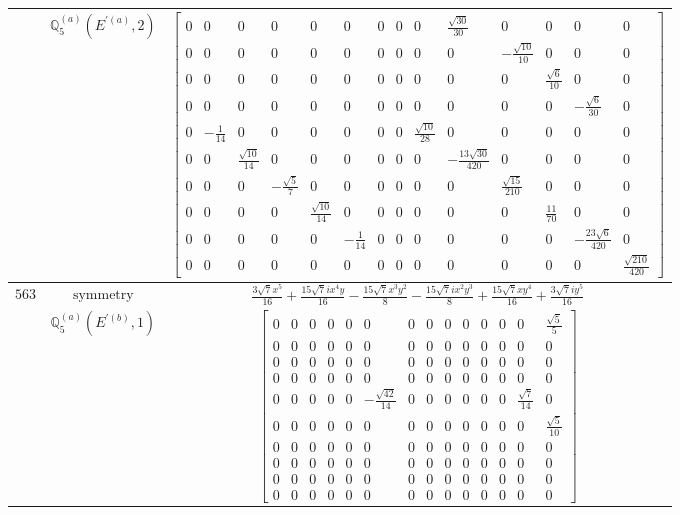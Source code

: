 \documentclass[fleqn,8pt,landscape]{jsarticle}
\begin{document}
\begin{longtable}{ccc}
$  $ & $ \mathbb{Q}_{5}^{(a)}(E^{\prime(a)},2) $ & $ \begin{bmatrix} 0 & 0 & 0 & 0 & 0 & 0 & 0 & 0 & 0 & \frac{\sqrt{30}}{30} & 0 & 0 & 0 & 0 \\ 0 & 0 & 0 & 0 & 0 & 0 & 0 & 0 & 0 & 0 & - \frac{\sqrt{10}}{10} & 0 & 0 & 0 \\ 0 & 0 & 0 & 0 & 0 & 0 & 0 & 0 & 0 & 0 & 0 & \frac{\sqrt{6}}{10} & 0 & 0 \\ 0 & 0 & 0 & 0 & 0 & 0 & 0 & 0 & 0 & 0 & 0 & 0 & - \frac{\sqrt{6}}{30} & 0 \\ 0 & - \frac{1}{14} & 0 & 0 & 0 & 0 & 0 & 0 & \frac{\sqrt{10}}{28} & 0 & 0 & 0 & 0 & 0 \\ 0 & 0 & \frac{\sqrt{10}}{14} & 0 & 0 & 0 & 0 & 0 & 0 & - \frac{13 \sqrt{30}}{420} & 0 & 0 & 0 & 0 \\ 0 & 0 & 0 & - \frac{\sqrt{5}}{7} & 0 & 0 & 0 & 0 & 0 & 0 & \frac{\sqrt{15}}{210} & 0 & 0 & 0 \\ 0 & 0 & 0 & 0 & \frac{\sqrt{10}}{14} & 0 & 0 & 0 & 0 & 0 & 0 & \frac{11}{70} & 0 & 0 \\ 0 & 0 & 0 & 0 & 0 & - \frac{1}{14} & 0 & 0 & 0 & 0 & 0 & 0 & - \frac{23 \sqrt{6}}{420} & 0 \\ 0 & 0 & 0 & 0 & 0 & 0 & 0 & 0 & 0 & 0 & 0 & 0 & 0 & \frac{\sqrt{210}}{420} \end{bmatrix} $ \\ \hline
$ 563 $ & $ \text{symmetry} $ & $ \frac{3 \sqrt{7} x^{5}}{16} + \frac{15 \sqrt{7} i x^{4} y}{16} - \frac{15 \sqrt{7} x^{3} y^{2}}{8} - \frac{15 \sqrt{7} i x^{2} y^{3}}{8} + \frac{15 \sqrt{7} x y^{4}}{16} + \frac{3 \sqrt{7} i y^{5}}{16} $ \\
$  $ & $ \mathbb{Q}_{5}^{(a)}(E^{\prime(b)},1) $ & $ \begin{bmatrix} 0 & 0 & 0 & 0 & 0 & 0 & 0 & 0 & 0 & 0 & 0 & 0 & 0 & \frac{\sqrt{5}}{5} \\ 0 & 0 & 0 & 0 & 0 & 0 & 0 & 0 & 0 & 0 & 0 & 0 & 0 & 0 \\ 0 & 0 & 0 & 0 & 0 & 0 & 0 & 0 & 0 & 0 & 0 & 0 & 0 & 0 \\ 0 & 0 & 0 & 0 & 0 & 0 & 0 & 0 & 0 & 0 & 0 & 0 & 0 & 0 \\ 0 & 0 & 0 & 0 & 0 & - \frac{\sqrt{42}}{14} & 0 & 0 & 0 & 0 & 0 & 0 & \frac{\sqrt{7}}{14} & 0 \\ 0 & 0 & 0 & 0 & 0 & 0 & 0 & 0 & 0 & 0 & 0 & 0 & 0 & \frac{\sqrt{5}}{10} \\ 0 & 0 & 0 & 0 & 0 & 0 & 0 & 0 & 0 & 0 & 0 & 0 & 0 & 0 \\ 0 & 0 & 0 & 0 & 0 & 0 & 0 & 0 & 0 & 0 & 0 & 0 & 0 & 0 \\ 0 & 0 & 0 & 0 & 0 & 0 & 0 & 0 & 0 & 0 & 0 & 0 & 0 & 0 \\ 0 & 0 & 0 & 0 & 0 & 0 & 0 & 0 & 0 & 0 & 0 & 0 & 0 & 0 \end{bmatrix} $ \\ \hline

\end{longtable}
\end{document}
